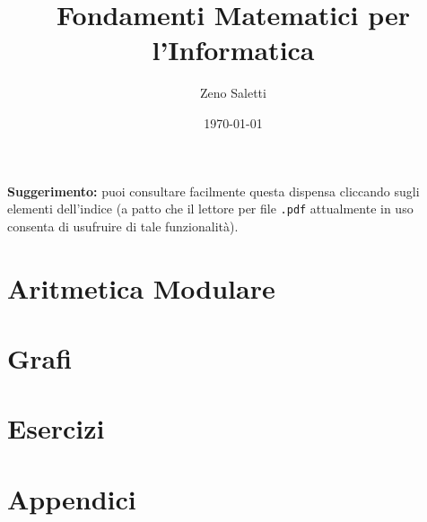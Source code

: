 \documentclass[a4paper, oneside]{book}
\title{Fondamenti Matematici per l'Informatica}
\author{Zeno Saletti}
\date{\today}
\begin{document}







\tableofcontents

\vspace*{2cm}
\begin{center}
    \textbf{Suggerimento:} puoi consultare facilmente questa dispensa
    cliccando sugli elementi dell'indice (a patto che il lettore per
    file \texttt{.pdf} attualmente in uso consenta di usufruire di
    tale funzionalità).
\end{center}

\part{Aritmetica Modulare}






\part{Grafi}






\part{Esercizi}





\part{Appendici}


\end{document}
